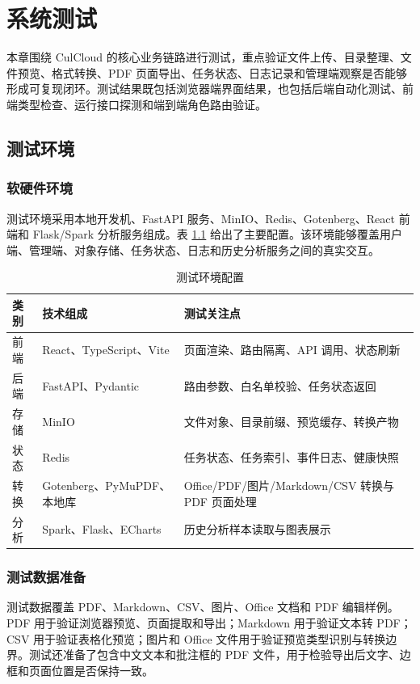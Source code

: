 \chapter{系统测试}

本章围绕 CulCloud 的核心业务链路进行测试，重点验证文件上传、目录整理、文件预览、格式转换、PDF 页面导出、任务状态、日志记录和管理端观察是否能够形成可复现闭环。测试结果既包括浏览器端界面结果，也包括后端自动化测试、前端类型检查、运行接口探测和端到端角色路由验证。

\section{测试环境}

\subsection{软硬件环境}

测试环境采用本地开发机、FastAPI 服务、MinIO、Redis、Gotenberg、React 前端和 Flask/Spark 分析服务组成。表 \ref{tab:test-env} 给出了主要配置。该环境能够覆盖用户端、管理端、对象存储、任务状态、日志和历史分析服务之间的真实交互。

\begin{table}[H]
  \centering
  \caption{测试环境配置}
  \label{tab:test-env}
  \begin{tabularx}{\textwidth}{llX}
    \toprule
    类别 & 技术组成 & 测试关注点 \\
    \midrule
    前端 & React、TypeScript、Vite & 页面渲染、路由隔离、API 调用、状态刷新 \\
    后端 & FastAPI、Pydantic & 路由参数、白名单校验、任务状态返回 \\
    存储 & MinIO & 文件对象、目录前缀、预览缓存、转换产物 \\
    状态 & Redis & 任务状态、任务索引、事件日志、健康快照 \\
    转换 & Gotenberg、PyMuPDF、本地库 & Office/PDF/图片/Markdown/CSV 转换与 PDF 页面处理 \\
    分析 & Spark、Flask、ECharts & 历史分析样本读取与图表展示 \\
    \bottomrule
  \end{tabularx}
\end{table}

\subsection{测试数据准备}

测试数据覆盖 PDF、Markdown、CSV、图片、Office 文档和 PDF 编辑样例。PDF 用于验证浏览器预览、页面提取和导出；Markdown 用于验证文本转 PDF；CSV 用于验证表格化预览；图片和 Office 文件用于验证预览类型识别与转换边界。测试还准备了包含中文文本和批注框的 PDF 文件，用于检验导出后文字、边框和页面位置是否保持一致。

